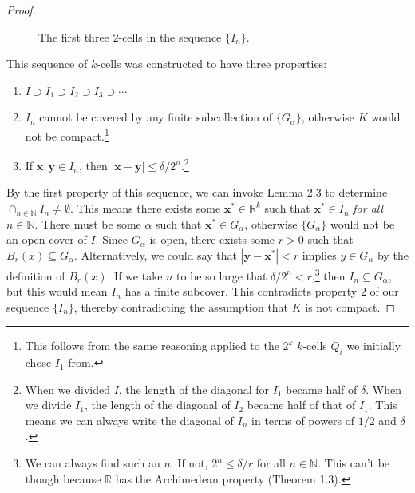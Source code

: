 \documentclass{article}
\newcommand{\N}{\mathbb{N}}
\newcommand{\R}{\mathbb{R}}
\newcommand{\x}{\mathbf{x}}
\newcommand{\y}{\mathbf{y}}
\theoremstyle{definition}
\begin{document}
\begin{proof}
\begin{figure}[h!]
			\caption{The first three $ 2 $-cells in the sequence $ \{I_n\} $.}
		\end{figure}
		This sequence of $ k $-cells was constructed to have three properties:
		\begin{enumerate}
			\item $ I\supset I_1\supset I_2\supset I_3\supset\cdots $
			\item $ I_n $ cannot be covered by any finite subcollection of $ \{G_\alpha\} $, otherwise $ K $ would not be compact.\footnote{This follows from the same reasoning applied to the $ 2^k $ $ k $-cells $ Q_i $ we initially chose $ I_1 $ from.}
			\item If $ \x,\y\in I_n $, then $ |\x-\y|\le \delta/2^n $.\footnote{When we divided $ I $, the length of the diagonal for $ I_1 $ became half of $ \delta $. When we divide $ I_1 $, the length of the diagonal of $ I_2 $ became half of that of $ I_1 $. This means we can always write the diagonal of $ I_n $ in terms of powers of $ 1/2 $ and $ \delta $.  }
		\end{enumerate}
		By the first property of this sequence, we can invoke Lemma 2.3 to determine $ \cap_{n\in\N} I_n\neq\emptyset $. This means there exists some $ \x^*\in\R^k $ such that $ \x^*\in I_n $ \textit{for all} $ n\in\N $. There must be some $ \alpha $ such that $ \x^*\in G_\alpha $, otherwise $ \{G_\alpha\} $ would not be an open cover of $ I $. Since $ G_\alpha $ is open, there exists some $ r>0 $ such that $ B_r(x)\subseteq G_\alpha $. Alternatively, we could say that $ |\y-\x^*|<r $ implies $ y\in G_\alpha $ by the definition of $ B_r(x) $. If we take $ n $ to be so large that $ \delta/2^n<r $,\footnote{We can always find such an $ n $. If not, $ 2^n\le\delta /r $ for all $ n \in\N$. This can't be though because $ \R $ has the Archimedean property (Theorem 1.3).} then $ I_n\subseteq G_\alpha $, but this would mean $ I_n $ has a finite subcover. This contradicts property $ 2 $ of our sequence $ \{I_n\} $, thereby contradicting the assumption that $ K $ is not compact. 
	\end{proof}
\end{document}
